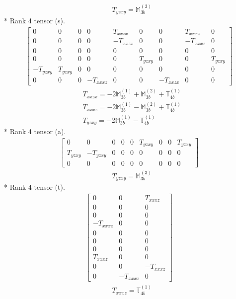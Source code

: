 \documentclass[fleqn,8pt,landscape]{jsarticle}
\begin{document}
\begin{align*}
& T_{yzxy} = \mathbb{M}_{3b}^{(3)}
\end{align*}
* Rank 4 tensor (s).
\begin{align*}
\begin{bmatrix} 0 & 0 & 0 & 0 & T_{xxzx} & 0 & 0 & T_{xxxz} & 0 \\ 0 & 0 & 0 & 0 & - T_{xxzx} & 0 & 0 & - T_{xxxz} & 0 \\ 0 & 0 & 0 & 0 & 0 & 0 & 0 & 0 & 0 \\ 0 & 0 & 0 & 0 & 0 & T_{yzxy} & 0 & 0 & T_{yzxy} \\ - T_{yzxy} & T_{yzxy} & 0 & 0 & 0 & 0 & 0 & 0 & 0 \\ 0 & 0 & 0 & - T_{xxxz} & 0 & 0 & - T_{xxzx} & 0 & 0 \end{bmatrix}
\end{align*}
\begin{align*}
& T_{xxzx} = - 2 \mathbb{M}_{3b}^{(1)} + \mathbb{M}_{3b}^{(2)} + \mathbb{T}_{4b}^{(1)} \\
& T_{xxxz} = - 2 \mathbb{M}_{3b}^{(1)} - \mathbb{M}_{3b}^{(2)} + \mathbb{T}_{4b}^{(1)} \\
& T_{yzxy} = - 2 \mathbb{M}_{3b}^{(1)} - \mathbb{T}_{4b}^{(1)}
\end{align*}
* Rank 4 tensor (a).
\begin{align*}
\begin{bmatrix} 0 & 0 & 0 & 0 & 0 & T_{yzxy} & 0 & 0 & T_{yzxy} \\ T_{yzxy} & - T_{yzxy} & 0 & 0 & 0 & 0 & 0 & 0 & 0 \\ 0 & 0 & 0 & 0 & 0 & 0 & 0 & 0 & 0 \end{bmatrix}
\end{align*}
\begin{align*}
& T_{yzxy} = \mathbb{M}_{3b}^{(3)}
\end{align*}
* Rank 4 tensor (t).
\begin{align*}
\begin{bmatrix} 0 & 0 & T_{xxxz} \\ 0 & 0 & 0 \\ 0 & 0 & 0 \\ - T_{xxxz} & 0 & 0 \\ 0 & 0 & 0 \\ 0 & 0 & 0 \\ 0 & 0 & 0 \\ T_{xxxz} & 0 & 0 \\ 0 & 0 & - T_{xxxz} \\ 0 & - T_{xxxz} & 0 \end{bmatrix}
\end{align*}
\begin{align*}
& T_{xxxz} = \mathbb{T}_{4b}^{(1)}
\end{align*}
\end{document}
